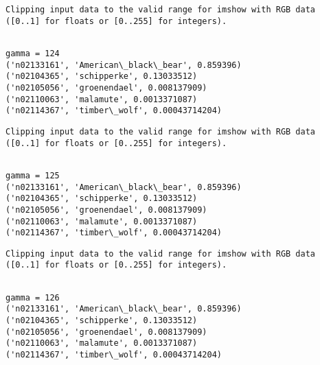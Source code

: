 \documentclass[11pt]{article}
\begin{document}
    \begin{Verbatim}[commandchars=\\\{\}]
Clipping input data to the valid range for imshow with RGB data ([0..1] for floats or [0..255] for integers).

    \end{Verbatim}

    \begin{Verbatim}[commandchars=\\\{\}]

gamma = 124
('n02133161', 'American\_black\_bear', 0.859396)
('n02104365', 'schipperke', 0.13033512)
('n02105056', 'groenendael', 0.008137909)
('n02110063', 'malamute', 0.0013371087)
('n02114367', 'timber\_wolf', 0.00043714204)

    \end{Verbatim}

    \begin{Verbatim}[commandchars=\\\{\}]
Clipping input data to the valid range for imshow with RGB data ([0..1] for floats or [0..255] for integers).

    \end{Verbatim}

    \begin{Verbatim}[commandchars=\\\{\}]

gamma = 125
('n02133161', 'American\_black\_bear', 0.859396)
('n02104365', 'schipperke', 0.13033512)
('n02105056', 'groenendael', 0.008137909)
('n02110063', 'malamute', 0.0013371087)
('n02114367', 'timber\_wolf', 0.00043714204)

    \end{Verbatim}

    \begin{Verbatim}[commandchars=\\\{\}]
Clipping input data to the valid range for imshow with RGB data ([0..1] for floats or [0..255] for integers).

    \end{Verbatim}

    \begin{Verbatim}[commandchars=\\\{\}]

gamma = 126
('n02133161', 'American\_black\_bear', 0.859396)
('n02104365', 'schipperke', 0.13033512)
('n02105056', 'groenendael', 0.008137909)
('n02110063', 'malamute', 0.0013371087)
('n02114367', 'timber\_wolf', 0.00043714204)

    \end{Verbatim}
\end{document}
